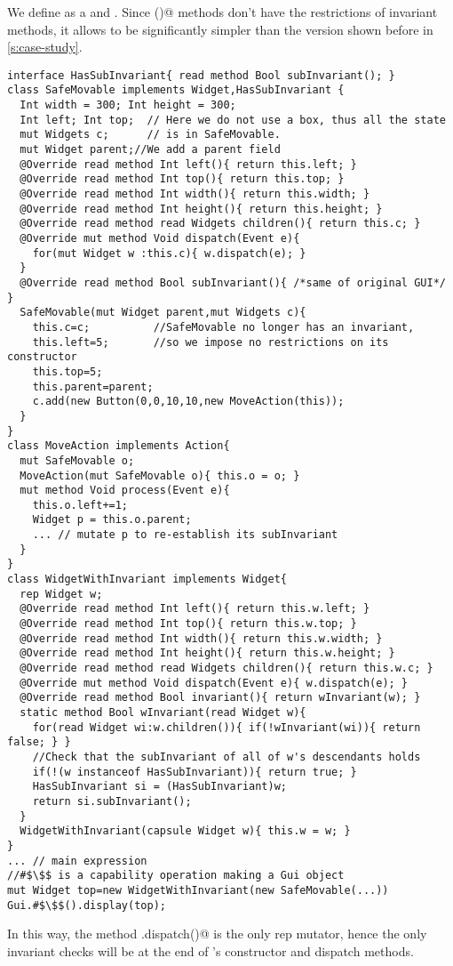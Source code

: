 We define \Q@SafeMovable@ as a \Q@Widget@ and \Q@HasSubInvariant@. Since \Q@subInvariant()@ methods don't have the restrictions of invariant methods, it allows \Q@SafeMovable@ to be significantly simpler than the version shown before in \autoref{s:case-study}.
\begin{lstlisting}
interface HasSubInvariant{ read method Bool subInvariant(); }
class SafeMovable implements Widget,HasSubInvariant {
  Int width = 300; Int height = 300;
  Int left; Int top;  // Here we do not use a box, thus all the state
  mut Widgets c;      // is in SafeMovable.
  mut Widget parent;//We add a parent field
  @Override read method Int left(){ return this.left; }
  @Override read method Int top(){ return this.top; }
  @Override read method Int width(){ return this.width; }
  @Override read method Int height(){ return this.height; }
  @Override read method read Widgets children(){ return this.c; }
  @Override mut method Void dispatch(Event e){
    for(mut Widget w :this.c){ w.dispatch(e); }
  }
  @Override read method Bool subInvariant(){ /*same of original GUI*/ }
  SafeMovable(mut Widget parent,mut Widgets c){
    this.c=c;          //SafeMovable no longer has an invariant,
    this.left=5;       //so we impose no restrictions on its constructor
    this.top=5;
    this.parent=parent;
    c.add(new Button(0,0,10,10,new MoveAction(this));
  }
}
class MoveAction implements Action{
  mut SafeMovable o;
  MoveAction(mut SafeMovable o){ this.o = o; }
  mut method Void process(Event e){
    this.o.left+=1;
    Widget p = this.o.parent;
    ... // mutate p to re-establish its subInvariant
  }
}
class WidgetWithInvariant implements Widget{
  rep Widget w;
  @Override read method Int left(){ return this.w.left; }
  @Override read method Int top(){ return this.w.top; }
  @Override read method Int width(){ return this.w.width; }
  @Override read method Int height(){ return this.w.height; }
  @Override read method read Widgets children(){ return this.w.c; }
  @Override mut method Void dispatch(Event e){ w.dispatch(e); }
  @Override read method Bool invariant(){ return wInvariant(w); }
  static method Bool wInvariant(read Widget w){
    for(read Widget wi:w.children()){ if(!wInvariant(wi)){ return false; } }
    //Check that the subInvariant of all of w's descendants holds
    if(!(w instanceof HasSubInvariant)){ return true; }
    HasSubInvariant si = (HasSubInvariant)w;
    return si.subInvariant();
  }
  WidgetWithInvariant(capsule Widget w){ this.w = w; }
}
... // main expression
//#$\$$ is a capability operation making a Gui object
mut Widget top=new WidgetWithInvariant(new SafeMovable(...))
Gui.#$\$$().display(top);
\end{lstlisting}
In this way, the method \Q@WidgetWithInvariant.dispatch()@ is the only rep mutator, hence the only invariant checks will be at the end of \Q@WidgetWithInvariant@'s constructor and dispatch methods.

